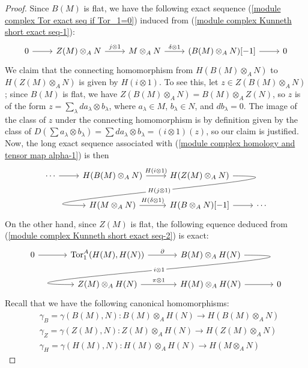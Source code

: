 \begin{proof}
Since $B(M)$ is flat, we have the following exact sequence (\cref{module complex Tor exact seq if Tor_1=0}) induced from (\ref{module complex Kunneth short exact seq-1}):
\begin{equation}\label{module complex homology and tensor map alpha-1}
\begin{tikzcd}
0\ar[r]&Z(M)\otimes_AN\ar[r,"j\otimes 1"]&M\otimes_AN\ar[r,"\delta\otimes 1"]&(B(M)\otimes_AN)[-1]\ar[r]&0
\end{tikzcd}
\end{equation}
We claim that the connecting homomorphism from $H(B(M)\otimes_AN)$ to $H(Z(M)\otimes_AN)$ is given by $H(i\otimes 1)$. To see this, let $z\in Z(B(M)\otimes_AN)$; since $B(M)$ is flat, we have $Z(B(M)\otimes_AN)=B(M)\otimes_AZ(N)$, so $z$ is of the form $z=\sum_\lambda da_\lambda\otimes b_\lambda$, where $a_\lambda\in M$, $b_\lambda\in N$, and $db_\lambda=0$. The image of the class of $z$ under the connecting homomorphism is by definition given by the class of $D(\sum a_\lambda\otimes b_\lambda)=\sum da_\lambda\otimes b_\lambda=(i\otimes 1)(z)$, so our claim is justified. Now, the long exact sequence associated with (\ref{module complex homology and tensor map alpha-1}) is then
\[\begin{tikzcd}
\cdots\ar[r]&H(B(M)\otimes_AN)\ar[r,"H(i\otimes 1)"]&H(Z(M)\otimes_AN)
\ar[out=0, in=180, looseness=2, overlay,"H(j\otimes 1)"description]{dl}\\
&H(M\otimes_AN)\ar[r,"H(\delta\otimes 1)"]&H(B\otimes_AN)[-1]\ar[r]&\cdots
\end{tikzcd}\]
On the other hand, since $Z(M)$ is flat, the following equence deduced from (\ref{module complex Kunneth short exact seq-2}) is exact:
\[\begin{tikzcd}[column sep=12mm]
0\ar[r]&\Tor_1^A(H(M),H(N))\ar[r,"\partial"]&B(M)\otimes_AH(N)\ar[out=0, in=180, looseness=2, overlay,"i\otimes 1"description]{dl}\\
&Z(M)\otimes_AH(N)\ar[r,"\pi\otimes 1"]&H(M)\otimes_AH(N)\ar[r]&0
\end{tikzcd}\]
Recall that we have the following canonical homomorphisms:
\begin{align*}
&\gamma_B=\gamma(B(M),N):B(M)\otimes_AH(N)\to H(B(M)\otimes_AN)\\
&\gamma_Z=\gamma(Z(M),N):Z(M)\otimes_AH(N)\to H(Z(M)\otimes_AN)\\
&\gamma_H=\gamma(H(M),N):H(M)\otimes_AH(N)\to H(M\otimes_AN)
\end{align*}

\end{proof}
